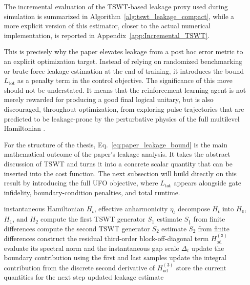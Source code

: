 The incremental evaluation of the TSWT-based leakage proxy used during simulation is summarized in Algorithm~\ref{alg:tswt_leakage_compact}, while a more explicit version of this estimator, closer to the actual numerical implementation, is reported in Appendix~\ref{app:Incremental_TSWT}.

This is precisely why the paper elevates leakage from a post hoc error metric to an explicit optimization target. Instead of relying on randomized benchmarking or brute-force leakage estimation at the end of training, it introduces the bound \(L_{\mathrm{tot}}\) as a penalty term in the control objective. The significance of this move should not be understated. It means that the reinforcement-learning agent is not merely rewarded for producing a good final logical unitary, but is also discouraged, throughout optimization, from exploring pulse trajectories that are predicted to be leakage-prone by the perturbative physics of the full multilevel Hamiltonian \cite{Niu2019}.

For the structure of the thesis, Eq.~\eqref{eq:paper_leakage_bound} is the main mathematical outcome of the paper's leakage analysis. It takes the abstract discussion of TSWT and turns it into a concrete scalar quantity that can be inserted into the cost function. The next subsection will build directly on this result by introducing the full UFO objective, where \(L_{\mathrm{tot}}\) appears alongside gate infidelity, boundary-condition penalties, and total runtime.


\begin{algorithm}[t]
\caption{Incremental update of the TSWT-based leakage estimator}
\label{alg:tswt_leakage_compact}
\begin{algorithmic}[1]
\Require instantaneous Hamiltonian $H_t$, effective anharmonicity $\eta_t$
\State decompose $H_t$ into $H_0$, $H_1$, and $H_2$
\State compute the first TSWT generator $S_1$
\State estimate $\dot S_1$ from finite differences
\State compute the second TSWT generator $S_2$
\State estimate $\dot S_2$ from finite differences
\State construct the residual third-order block-off-diagonal term $H_{\mathrm{od}}^{(3)}$
\State evaluate its spectral norm and the instantaneous gap scale $\Delta_t$
\State update the boundary contribution using the first and last samples
\State update the integral contribution from the discrete second derivative of $H_{\mathrm{od}}^{(3)}$
\State store the current quantities for the next step
\State \Return updated leakage estimate
\end{algorithmic}
\end{algorithm}

